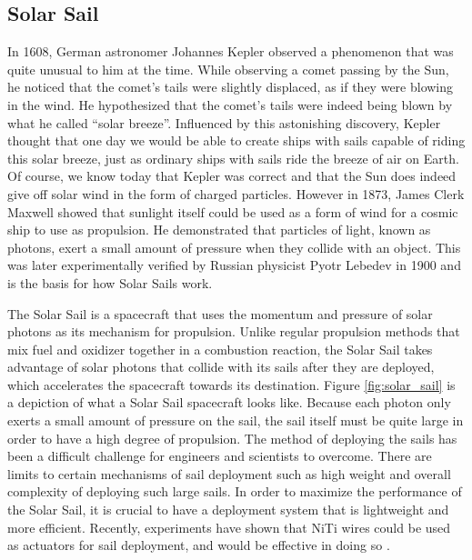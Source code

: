 \begin{multicols}{2}
\section{Solar Sail}
In 1608, German astronomer Johannes Kepler observed a phenomenon that was quite unusual to him at the time. While observing a comet passing by the Sun, he noticed that the comet’s tails were slightly displaced, as if they were blowing in the wind. He hypothesized that the comet’s tails were indeed being blown by what he called ``solar breeze”. Influenced by this astonishing discovery, Kepler thought that one day we would be able to create ships with sails capable of riding this solar breeze, just as ordinary ships with sails ride the breeze of air on Earth. Of course, we know today that Kepler was correct and that the Sun does indeed give off solar wind in the form of charged particles. However in 1873, James Clerk Maxwell showed that sunlight itself could be used as a form of wind for a cosmic ship to use as propulsion. He demonstrated that particles of light, known as photons, exert a small amount of pressure when they collide with an object. This was later experimentally verified by Russian physicist Pyotr Lebedev in 1900 \cite{lebedev1901investigations} and is the basis for how Solar Sails work.

The Solar Sail is a spacecraft that uses the momentum and pressure of solar photons as its mechanism for propulsion. Unlike regular propulsion methods that mix fuel and oxidizer together in a combustion reaction, the Solar Sail takes advantage of solar photons that collide with its sails after they are deployed, which accelerates the spacecraft towards its destination. Figure \ref{fig:solar_sail} is a depiction of what a Solar Sail spacecraft looks like. Because each photon only exerts a small amount of pressure on the sail, the sail itself must be quite large in order to have a high degree of propulsion. The method of deploying the sails has been a difficult challenge for engineers and scientists to overcome. There are limits to certain mechanisms of sail deployment such as high weight and overall complexity of deploying such large sails. In order to maximize the performance of the Solar Sail, it is crucial to have a deployment system that is lightweight and more efficient. Recently, experiments have shown that NiTi wires could be used as actuators for sail deployment, and would be effective in doing so \cite{bovesecchi2019novel}.


\end{multicols}
